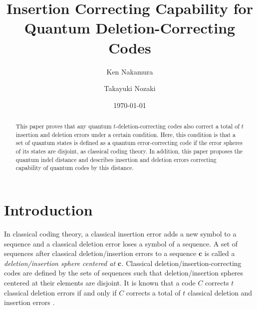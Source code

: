 \documentclass[reprint,amsmath,amssymb,aps,]{revtex4-2}
\theoremstyle{definition}
\newcommand{\1}{\mbox{1}\hspace{-0.25em}\mbox{l}}%
\begin{document}

\title{Insertion Correcting Capability for Quantum Deletion-Correcting Codes}

\author{Ken Nakamura}
\author{Takayuki Nozaki}%

\date{\today}%

\begin{abstract}
  This paper proves that
  any quantum $t$-deletion-correcting codes
  also correct a total of $t$ insertion and deletion errors
  under a certain condition.
  Here,
  this condition
  is that
  a set of quantum states is defined as a quantum error-correcting code
  if
  the error spheres of its states are disjoint,
  as classical coding theory.
  In addition,
  this paper proposes the quantum indel distance
  and
  describes insertion and deletion errors correcting capability of quantum codes
  by this distance.
\end{abstract}

\maketitle

\section{Introduction}
In classical coding theory,
a classical insertion error adds a new symbol to a sequence
and
a classical deletion error loses a symbol of a sequence.
A set of sequences
after
classical deletion/insertion errors to a sequence $\bm{c}$
is called
a {\it deletion/insertion sphere centered at $\bm{c}$.}
Classical deletion/insertion-correcting codes
are defined by
the sets of sequences
such that
deletion/insertion spheres centered at their elements
are disjoint.
It is known that
a code $C$ corrects $t$ classical deletion errors
if and only if
$C$ corrects a total of $t$ classical deletion and insertion errors
\cite{levenshtein1966binary}.
\end{document}
